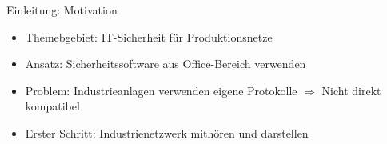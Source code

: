 \begin{frame}{Einleitung: Motivation}
    \begin{itemize}[<+->]
      \item Themebgebiet: IT-Sicherheit für Produktionsnetze
      \item Ansatz: Sicherheitssoftware aus Office-Bereich verwenden
      \item Problem: Industrieanlagen verwenden eigene Protokolle
            \newline $\Rightarrow$ Nicht direkt kompatibel
      \item Erster Schritt: Industrienetzwerk mithören und darstellen
    \end{itemize}
\end{frame} 